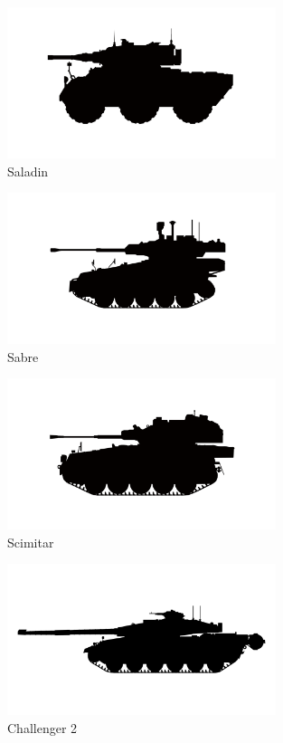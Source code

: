 \begin{figure}[h]
  \centering
  \includegraphics[width=0.7\textwidth]{platforms/saladin.pdf}
  \caption*{Saladin}
\end{figure}

\begin{figure}[h]
  \centering
  \includegraphics[width=0.7\textwidth]{platforms/sabre.pdf}
  \caption*{Sabre}
\end{figure}

\begin{figure}[h]
  \centering
  \includegraphics[width=0.7\textwidth]{platforms/scimitar.pdf}
  \caption*{Scimitar}
\end{figure}

\begin{figure}[h]
  \centering
  \includegraphics[width=0.7\textwidth]{platforms/challenger.pdf}
  \caption*{Challenger 2}
\end{figure}

